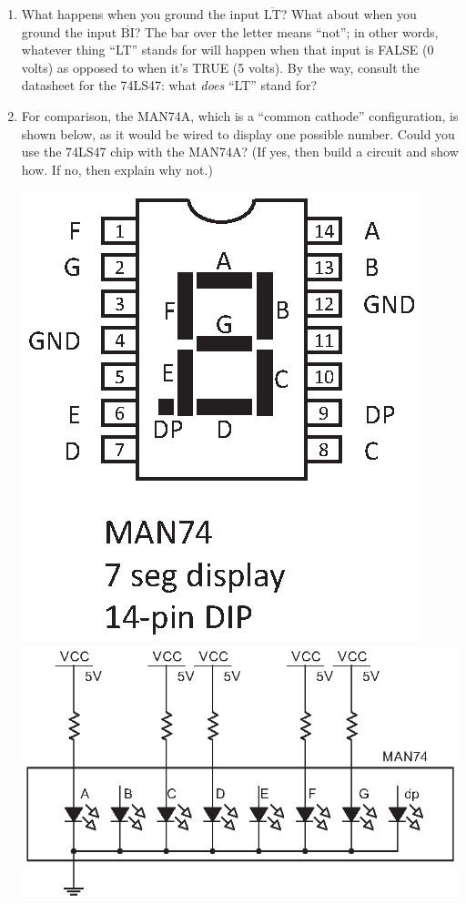 \begin{enumerate}
\item What happens when you ground the input $\mathrm{\overline{LT}}$?  What about when you ground the input $\mathrm{\overline{BI}}$?  The bar over the letter means ``not''; in other words, whatever thing ``LT'' stands for will happen when that input is FALSE (0 volts) as opposed to when it's TRUE (5 volts).  By the way, consult the datasheet for the 74LS47: what \textit{does} ``LT'' stand for?

\item For comparison, the MAN74A, which is a ``common cathode'' configuration, is shown below, as it would be wired to display one possible number.  Could you use the 74LS47 chip with the MAN74A?  (If yes, then build a circuit and show how.  If no, then explain why not.)
\begin{center}
\includegraphics[scale=0.8]{appendices/pinouts/man74.eps}
\includegraphics{counters/man74_circuit.eps}
\end{center}


\end{enumerate}

